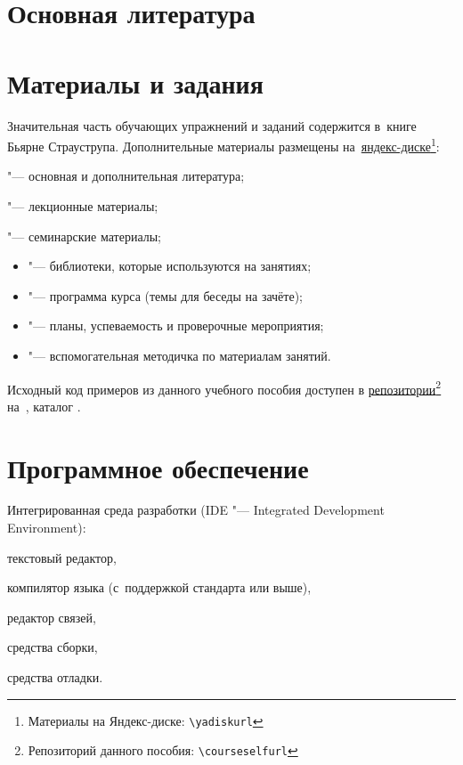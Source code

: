\section{Основная литература}
\cite{Stroustrup:2016:ru}

\nocite{Kernighan:2004:ru, Meyers:2006:ru, Meyers:2000:ru, Meyers:2002:ru, Meyers:2016:ru, Josuttis:2014:ru, Stroustrup:2006:ru, Stroustrup:2013:en}




\section{Материалы и задания}
Значительная часть обучающих упражнений и заданий содержится в~книге Бьярне Страуструпа. Дополнительные материалы размещены на~\href{\yadiskurl}{яндекс-диске\footnote{Материалы на Яндекс-диске: \nolinkurl{\yadiskurl}}}:
\begin{itemfeature}
  \item {} "--- основная и дополнительная литература;
  \item {} "--- лекционные материалы;
  \item {} "--- семинарские материалы;
  \begin{itemize}
  	\item {} "--- библиотеки, которые используются на занятиях;
  	\item {} "--- программа курса (темы для беседы на зачёте);
  	\item {} "--- планы, успеваемость и проверочные мероприятия;
  	\item {} "--- вспомогательная методичка по материалам занятий.
  \end{itemize}
\end{itemfeature}

Исходный код примеров из данного учебного пособия доступен в \href{\courseselfurl}{репозитории}\footnote{Репозиторий данного пособия: \nolinkurl{\courseselfurl}} на~, каталог .



\section{Программное обеспечение}
Интегрированная среда разработки (IDE "--- \textenglish{Integrated Development Environment}):
\begin{itemfeature}
  \item текстовый редактор,
  \item компилятор языка  (с~поддержкой стандарта  или выше),
  \item редактор связей,
  \item средства сборки,
  \item средства отладки.
\end{itemfeature}



